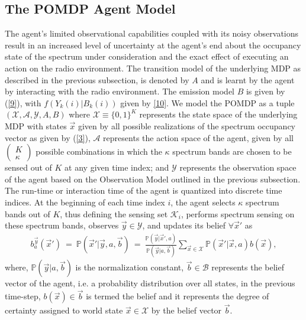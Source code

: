 \documentclass[10pt,twocolumn]{IEEEtran}
\begin{document}
\subsection{The POMDP Agent Model}
The agent's limited observational capabilities coupled with its noisy observations result in an increased level of uncertainty at the agent's end about the occupancy state of the spectrum under consideration and the exact effect of executing an action on the radio environment. The transition model of the underlying MDP as described in the previous subsection, is denoted by $A$ and is learnt by the agent by interacting with the radio environment. The emission model $B$ is given by (\ref{9}), with $f(Y_k(i)|B_k(i))$ given by \eqref{10}. We model the POMDP as a tuple $(\mathcal{X},\mathcal{A},\mathcal{Y},A,B)$ where $\mathcal{X}\equiv\{0,1\}^K$ represents the state space of the underlying MDP with states $\vec{x}$ given by all possible realizations of the spectrum occupancy vector as given by (\ref{3}), $\mathcal{A}$ represents the action space of the agent, given by all $\left(\begin{array}{c}K\\\kappa\end{array}\right)$ possible combinations in which the $\kappa$ spectrum bands are chosen to be sensed out of $K$ at any given time index; and $\mathcal{Y}$ represents the observation space of the agent based on the Observation Model outlined in the previous subsection. The run-time or interaction time of the agent is quantized into discrete time indices. At the beginning of each time index $i$, the agent selects $\kappa$ spectrum bands out of $K$, thus defining the sensing set $\mathcal K_i$, performs spectrum sensing  on these spectrum bands, observes $\vec{y} \in \mathcal{Y}$, and updates its belief $\forall \vec{x}'$ as
\begin{equation}\label{11}
    \begin{aligned}
        b_a^{\vec{y}}(\vec{x}')\ =\ \mathbb{P}(\vec{x}'|\vec{y},a,\vec{b})\ =\ \frac{\mathbb{P}(\vec{y}|\vec{x}',a)}{\mathbb{P}(\vec{y}|a,\vec{b})}\sum_{\vec{x} \in \mathcal{X}}\mathbb{P}(\vec{x}'|\vec{x},a)b(\vec{x}),
    \end{aligned}
\end{equation}
where, $\mathbb{P}(\vec{y}|a,\vec{b})$ is the normalization constant, $\vec{b} \in \mathcal{B}$ represents the belief vector of the agent, i.e. a probability distribution over all states, in the previous time-step, $b(\vec{x}) \in \vec{b}$ is termed the belief and it represents the degree of certainty assigned to world state $\vec{x} \in \mathcal{X}$ by the belief vector $\vec{b}$.
\end{document}
